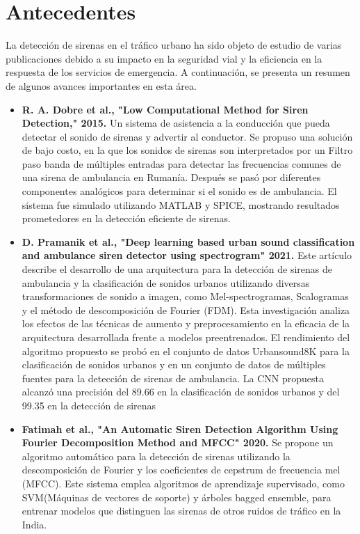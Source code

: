 \documentclass[conference, spanish, english]{IEEEtran}
\begin{document}
\section{Antecedentes}
La detección de sirenas en el tráfico urbano ha sido objeto de estudio de varias publicaciones debido a su impacto en la seguridad vial y la eficiencia en la respuesta de los servicios de emergencia. A continuación, se presenta un resumen de algunos avances importantes en esta área.

\begin{itemize}

\item \textbf{\cite{Dobre2015} R. A. Dobre et al., "Low Computational Method for Siren Detection,"  2015.}
Un sistema de asistencia a la conducción que pueda detectar el sonido de sirenas y advertir al conductor. Se propuso una solución de bajo costo, en la que los sonidos de sirenas son interpretados por un Filtro paso banda de múltiples entradas para detectar las frecuencias comunes de una sirena de ambulancia en Rumanía. Después se pasó por diferentes componentes analógicos para determinar si el sonido es de ambulancia. El sistema fue simulado utilizando MATLAB y SPICE, mostrando resultados prometedores en la detección eficiente de sirenas.

  
\item \textbf{\cite{Pramanick2021} D. Pramanik et al., "Deep learning based urban sound classification and ambulance siren detector using spectrogram" 2021.}
Este artículo describe el desarrollo de una arquitectura para la detección de sirenas de ambulancia y la clasificación de sonidos urbanos utilizando diversas transformaciones de sonido a imagen, como Mel-spectrogramas, Scalogramas y el método de descomposición de Fourier (FDM). Esta investigación analiza los efectos de las técnicas de aumento y preprocesamiento en la eficacia de la arquitectura desarrollada frente a modelos preentrenados. El rendimiento del algoritmo propuesto se probó en el conjunto de datos Urbansound8K para la clasificación de sonidos urbanos y en un conjunto de datos de múltiples fuentes para la detección de sirenas de ambulancia. La CNN propuesta alcanzó una precisión del 89.66 en la clasificación de sonidos urbanos y del 99.35 en la detección de sirenas



\item \textbf{\cite{Fatimah2020} Fatimah et al., "An Automatic Siren Detection Algorithm Using Fourier Decomposition Method and MFCC"
 2020.}
Se propone un algoritmo automático para la detección de sirenas utilizando la descomposición de Fourier y los coeficientes de cepstrum de frecuencia mel (MFCC). Este sistema emplea algoritmos de aprendizaje supervisado, como SVM(Máquinas de vectores de soporte) y árboles bagged ensemble, para entrenar modelos que distinguen las sirenas de otros ruidos de tráfico en la India.

\end{itemize}
\end{document}
